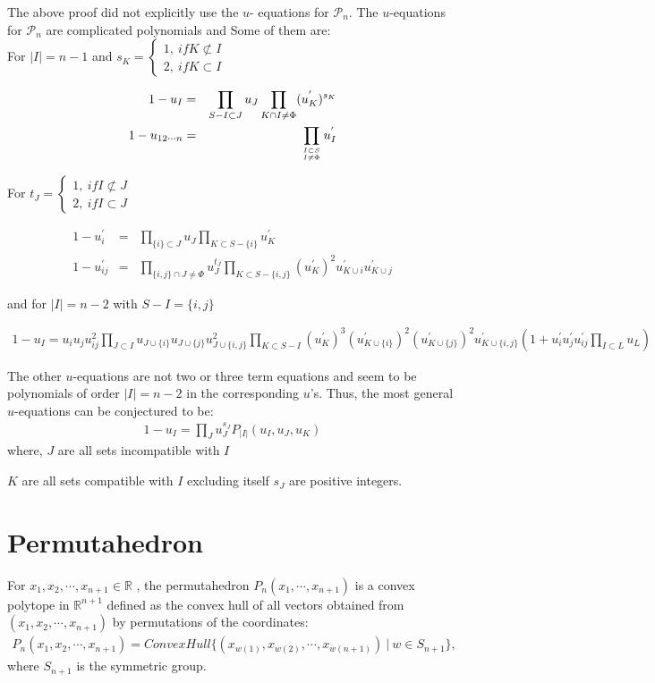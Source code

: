 \documentclass[hidelinks,12pt]{article}
\newcommand{\bea}[1]{\begin{eqnarray}\label{#1} }
\newcommand{\eea}{\end{eqnarray}}
\def\bea{\begin{eqnarray}}
\def\eea{\end{eqnarray}}
\begin{document}
\begin{enumerate}
\begin{enumerate}
The above proof did not explicitly use the $u$- equations for $\mathscr P_n$. 
The $u$-equations for $\mathscr P_n$ are complicated polynomials and Some of them are:\\

For $|I| =n-1$ and $s_K = \begin{cases}  1,~ if K \not\subset I & \\ 2, ~if K \subset I\end{cases}$

\bea
1-u_{I} &=& \prod_ {S - I \subset J } u_{J} \prod_ {K \cap I \ne \Phi } (u^{'}_{K})^{s_K}  \nonumber \\
1-u_{12\cdots n} &=& \prod_ {{I \subset S}\atop {I \ne \Phi}} u^{'}_{I} \nonumber
\eea

For $t_J = \begin{cases}  1,~ if I  \not\subset J & \\ 2, ~if I \subset J \end{cases}$

\bea
1-u^{'}_{i} &=& \prod_ {\{ i \} \subset J } u_{J} \prod_ {K \subset S- \{i\} } u^{'}_{K} \nonumber \\
1-u^{'}_{i j} &=& \prod_ {\{i,j \}\cap J \ne \Phi} u^{t_J}_{J} \prod_ {K \subset S-\{i, j \} } (u^{'}_{K})^{2} u^{'}_{K \cup {i}} u^{'}_{K \cup{j} } \nonumber 
\eea

and for $|I| =n-2$ with $S- I = \{i, j\}$

\bea
1-u_{I}= u_i u_j u^{2}_{ij} \prod_{J \subset I} u_{J \cup \{i\}} u_{J \cup \{j\}} u^{2}_{J \cup \{i,j\}} \prod_{K \subset S-I} (u^{'}_K)^{3} (u^{'}_{K \cup \{i\}})^{2}  (u^{'}_{K \cup\{j\}})^{2}  u^{'}_{K\cup \{i,j\}} \left( 1+ u^{'}_i u^{'}_j u^{'}_{ij} \prod_{I \subset L} u_L \right)                       \nonumber
\eea
   
The other $u$-equations are not two or three term equations and seem to be polynomials of order $|I|=n-2$ in the corresponding $u$'s. Thus, the most general $u$-equations can be conjectured to be:
\bea
1-u_{I} = \prod_{J} u^{s_J}_{J} P_{|I|}(u_I, u_J,u_K) 
\eea
where, $J$ are all sets incompatible with $I$

 $K$ are all sets compatible with $I$ excluding itself 
 $s_J$ are positive integers. 

\end{enumerate}
 





\section*{Permutahedron}
 For $x_1,x_2, \cdots, x_{n+1} \in \mathbb{R} $ , the permutahedron $P_n(x_1,\cdots,x_{n+1})$ is a convex polytope in $\mathbb{R}^{n+1}$ defined as the convex hull of all vectors obtained from $(x_1,x_2, \cdots, x_{n+1})$ by permutations of the coordinates:
 \bea
 P_n(x_1,x_2, \cdots, x_{n+1}) = ConvexHull \{ (x_{w(1)},x_{w(2)}, \cdots, x_{w(n+1)})~ |~ w \in S_{n+1} \}, \nonumber
 \eea
 where $S_{n+1}$ is the symmetric group. 
 

\end{enumerate}
\end{document}
